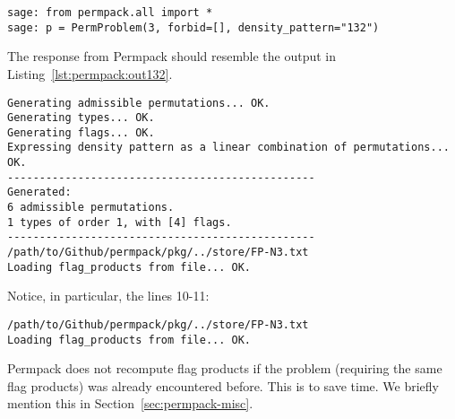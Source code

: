 \documentclass[12pt, a4paper, twoside]{report}
\begin{document}
 {}
\begin{lstlisting}
sage: from permpack.all import *
sage: p = PermProblem(3, forbid=[], density_pattern="132")
\end{lstlisting}
The response from Permpack should resemble the output in Listing~\ref{lst:permpack:out132}.
\begin{lstlisting}
Generating admissible permutations... OK.
Generating types... OK.
Generating flags... OK.
Expressing density pattern as a linear combination of permutations... OK.
------------------------------------------------
Generated:
6 admissible permutations.
1 types of order 1, with [4] flags.
------------------------------------------------
/path/to/Github/permpack/pkg/../store/FP-N3.txt
Loading flag_products from file... OK.
\end{lstlisting}
Notice, in particular, the lines 10-11:
\begin{lstlisting}
/path/to/Github/permpack/pkg/../store/FP-N3.txt
Loading flag_products from file... OK.
\end{lstlisting}
Permpack does not recompute flag products if the problem (requiring the same flag products) was already encountered before. This is to save time. We briefly mention this in Section~\ref{sec:permpack-misc}.
\end{document}
